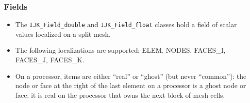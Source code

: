 \documentclass[10pt]{beamer}
\begin{document}
\begin{frame}[fragile]
\frametitle{Fields}
\begin{itemize}
  \item The \verb|IJK_Field_double| and \verb|IJK_Field_float| classes hold a field
    of scalar values localized on a split mesh.
  \item The following localizations are supported: ELEM, NODES, FACES\_I, FACES\_J, FACES\_K.
  \item On a processor, items are either ``real'' or ``ghost'' (but never ``common''):
    the node or face at the right of the last element on a processor is a ghost node or face;
    it is real on the processor that owns the next block of mesh cells.
\end{itemize}
\end{frame}
\end{document}
